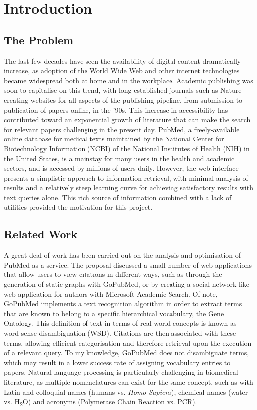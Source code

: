 \documentclass[Report.tex]{subfiles}
\begin{document}
\chapter{Introduction}
\section{The Problem}
The last few decades have seen the availability of digital content dramatically increase, as adoption of the World Wide Web and other internet technologies became widespread both at home and in the workplace. Academic publishing was soon to capitalise on this trend, with long-established journals such as Nature creating websites for all aspects of the publishing pipeline, from submission to publication of papers online, in the '90s\cite{nature-history}. This increase in accessibility has contributed toward an exponential growth of literature\cite{hunter-cohen} that can make the search for relevant papers challenging in the present day. PubMed, a freely-available online database for medical texts maintained by the National Center for Biotechnology Information (NCBI) of the National Institutes of Health (NIH) in the United States, is a mainstay for many users in the health and academic sectors, and is accessed by millions of users daily\cite{dogan}. However, the web interface presents a simplistic approach to information retrieval, with minimal analysis of results and a relatively steep learning curve for achieving satisfactory results with text queries alone. This rich source of information combined with a lack of utilities provided the motivation for this project.

\section{Related Work}
A great deal of work has been carried out on the analysis and optimisation of PubMed as a service. The proposal discussed a small number of web applications that allow users to view citations in different ways, such as through the generation of static graphs with GoPubMed\cite{gopubmed}, or by creating a social network-like web application for authors with Microsoft Academic Search\cite{mas}. Of note, GoPubMed implements a text recognition algorithm in order to extract terms that are known to belong to a specific hierarchical vocabulary, the Gene Ontology. This definition of text in terms of real-world concepts is known as word-sense disambiguation (WSD). Citations are then associated with these terms, allowing efficient categorisation and therefore retrieval upon the execution of a relevant query. To my knowledge, GoPubMed does not disambiguate terms, which may result in a lower success rate of assigning vocabulary entries to papers. Natural language processing is particularly challenging in biomedical literature, as multiple nomenclatures can exist for the same concept, such as with Latin and colloquial names (humans vs. \emph{Homo Sapiens}), chemical names (water vs. H{\textsubscript{2}}O) and acronyms (Polymerase Chain Reaction vs. PCR).\newline
\end{document}
